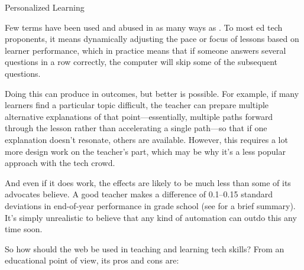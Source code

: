 \begin{aside}{Personalized Learning}

Few terms have been used and abused in as many ways as
. To most
ed tech proponents, it means dynamically adjusting the pace or focus
of lessons based on learner performance, which in practice means that
if someone answers several questions in a row correctly, the computer
will skip some of the subsequent questions.

Doing this can produce  in outcomes, but
better is possible. For example, if many learners find a particular
topic difficult, the teacher can prepare multiple alternative
explanations of that point---essentially, multiple paths forward
through the lesson rather than accelerating a single path---so that
if one explanation doesn't resonate, others are available. However,
this requires a lot more design work on the teacher's part, which
may be why it's a less popular approach with the tech crowd.

And even if it does work, the effects are likely to be much less
than some of its advocates believe. A good teacher makes a
difference of 0.1--0.15 standard deviations in end-of-year
performance in grade school \cite{Chet2014} (see  for a brief summary). It's simply
unrealistic to believe that any kind of automation can outdo this
any time soon.

\end{aside}

So how should the web be used in teaching and learning tech skills? From
an educational point of view, its pros and cons are:

